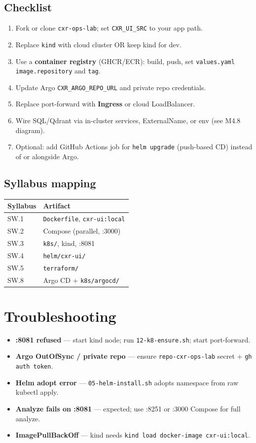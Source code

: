 \documentclass[11pt,a4paper]{report}
\begin{document}
\section{Checklist}
\begin{enumerate}
  \item Fork or clone \texttt{cxr-ops-lab}; set \texttt{CXR\_UI\_SRC} to your app path.
  \item Replace \texttt{kind} with cloud cluster OR keep kind for dev.
  \item Use a \textbf{container registry} (GHCR/ECR): build, push, set \texttt{values.yaml} \texttt{image.repository} and \texttt{tag}.
  \item Update Argo \texttt{CXR\_ARGO\_REPO\_URL} and private repo credentials.
  \item Replace port-forward with \textbf{Ingress} or cloud LoadBalancer.
  \item Wire SQL/Qdrant via in-cluster services, ExternalName, or env (see M4.8 diagram).
  \item Optional: add GitHub Actions job for \texttt{helm upgrade} (push-based CD) instead of or alongside Argo.
\end{enumerate}

\section{Syllabus mapping}
\begin{center}
\begin{tabular}{ll}
\toprule
Syllabus & Artifact \\
\midrule
SW.1 & \texttt{Dockerfile}, \texttt{cxr-ui:local} \\
SW.2 & Compose (parallel, :3000) \\
SW.3 & \texttt{k8s/}, kind, :8081 \\
SW.4 & \texttt{helm/cxr-ui/} \\
SW.5 & \texttt{terraform/} \\
SW.8 & Argo CD + \texttt{k8s/argocd/} \\
\bottomrule
\end{tabular}
\end{center}

\chapter{Troubleshooting}

\begin{itemize}
  \item \textbf{:8081 refused} --- start kind node; run \texttt{12-k8-ensure.sh}; start port-forward.
  \item \textbf{Argo OutOfSync / private repo} --- ensure \texttt{repo-cxr-ops-lab} secret + \texttt{gh auth token}.
  \item \textbf{Helm adopt error} --- \texttt{05-helm-install.sh} adopts namespace from raw kubectl apply.
  \item \textbf{Analyze fails on :8081} --- expected; use :8251 or :3000 Compose for full analyze.
  \item \textbf{ImagePullBackOff} --- kind needs \texttt{kind load docker-image cxr-ui:local}.
\end{itemize}
\end{document}
